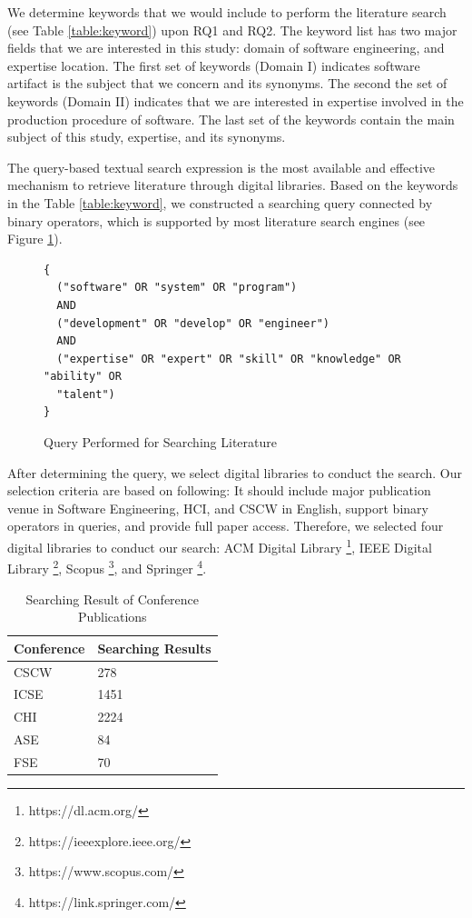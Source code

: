We determine keywords that we would include to perform the literature search (see Table \ref{table:keyword}) upon RQ1 and RQ2. The keyword list has two major fields that we are interested in this study: domain of software engineering, and expertise location. The first set of keywords (Domain I) indicates software artifact is the subject that we concern and its synonyms. The second the set of keywords (Domain II) indicates that we are interested in expertise involved in the production procedure of software. The last set of the keywords contain the main subject of this study, expertise, and its synonyms.

The query-based textual search expression is the most available and effective mechanism to retrieve literature through digital libraries. Based on the keywords in the Table \ref{table:keyword}, we constructed a searching query connected by binary operators, which is supported by most literature search engines (see Figure \ref{fig:query}). 

\begin{figure}
\begin{verbatim}
{
  ("software" OR "system" OR "program") 
  AND 
  ("development" OR "develop" OR "engineer") 
  AND 
  ("expertise" OR "expert" OR "skill" OR "knowledge" OR "ability" OR 
  "talent")
}
\end{verbatim}
  \caption{Query Performed for Searching Literature}
  \label{fig:query}
\end{figure}

After determining the query, we select digital libraries to conduct the search. Our selection criteria are based on following: It should include major publication venue in Software Engineering, HCI, and CSCW in English, support binary operators in queries, and provide full paper access. Therefore, we selected four digital libraries to conduct our search: ACM Digital Library \footnote{https://dl.acm.org/}, IEEE Digital Library \footnote{https://ieeexplore.ieee.org/}, Scopus \footnote{https://www.scopus.com/}, and Springer \footnote{https://link.springer.com/}.

\begin{table}[tbp]
\centering
\begin{tabular}{l l}
\hline
\textbf{Conference} & \textbf{Searching Results} \\ \hline
CSCW       & 278               \\ 
ICSE       & 1451              \\ 
CHI        & 2224              \\ 
ASE        & 84                \\
FSE        & 70                \\ \hline
\end{tabular}
\caption{Searching Result of Conference Publications}
\label{table:searching_conf}
\end{table}

